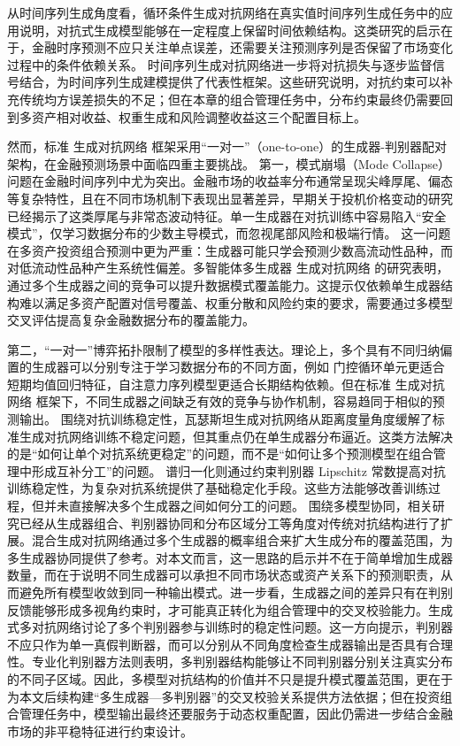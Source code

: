 从时间序列生成角度看，循环条件生成对抗网络在真实值时间序列生成任务中的应用说明，对抗式生成模型能够在一定程度上保留时间依赖结构\cite{esteban2017real}。这类研究的启示在于，金融时序预测不应只关注单点误差，还需要关注预测序列是否保留了市场变化过程中的条件依赖关系。
时间序列生成对抗网络进一步将对抗损失与逐步监督信号结合，为时间序列生成建模提供了代表性框架\cite{yoon2019time}。这些研究说明，对抗约束可以补充传统均方误差损失的不足；但在本章的组合管理任务中，分布约束最终仍需要回到多资产相对收益、权重生成和风险调整收益这三个配置目标上。

然而，标准 生成对抗网络 框架采用“一对一”（one-to-one）的生成器-判别器配对架构，在金融预测场景中面临四重主要挑战。
第一，模式崩塌（Mode Collapse）问题在金融时间序列中尤为突出。金融市场的收益率分布通常呈现尖峰厚尾、偏态等复杂特性，且在不同市场机制下表现出显著差异，早期关于投机价格变动的研究已经揭示了这类厚尾与非常态波动特征\cite{mandelbrot1963variation}。单一生成器在对抗训练中容易陷入“安全模式”，仅学习数据分布的少数主导模式，而忽视尾部风险和极端行情。
这一问题在多资产投资组合预测中更为严重：生成器可能只学会预测少数高流动性品种，而对低流动性品种产生系统性偏差。多智能体多生成器 生成对抗网络 的研究表明，通过多个生成器之间的竞争可以提升数据模式覆盖能力\cite{ghosh2017multi}。这提示仅依赖单生成器结构难以满足多资产配置对信号覆盖、权重分散和风险约束的要求，需要通过多模型交叉评估提高复杂金融数据分布的覆盖能力。

第二，“一对一”博弈拓扑限制了模型的多样性表达。理论上，多个具有不同归纳偏置的生成器可以分别专注于学习数据分布的不同方面，例如 门控循环单元更适合短期均值回归特征，自注意力序列模型更适合长期结构依赖。但在标准 生成对抗网络 框架下，不同生成器之间缺乏有效的竞争与协作机制，容易趋同于相似的预测输出。
围绕对抗训练稳定性，瓦瑟斯坦生成对抗网络从距离度量角度缓解了标准生成对抗网络训练不稳定问题，但其重点仍在单生成器分布逼近\cite{arjovsky2017wasserstein}。这类方法解决的是“如何让单个对抗系统更稳定”的问题，而不是“如何让多个预测模型在组合管理中形成互补分工”的问题。
谱归一化则通过约束判别器 Lipschitz 常数提高对抗训练稳定性，为复杂对抗系统提供了基础稳定化手段\cite{miyato2018spectral}。这些方法能够改善训练过程，但并未直接解决多个生成器之间如何分工的问题。
围绕多模型协同，相关研究已经从生成器组合、判别器协同和分布区域分工等角度对传统对抗结构进行了扩展。混合生成对抗网络通过多个生成器的概率组合来扩大生成分布的覆盖范围，为多生成器协同提供了参考\cite{hoang2018mgan}。对本文而言，这一思路的启示并不在于简单增加生成器数量，而在于说明不同生成器可以承担不同市场状态或资产关系下的预测职责，从而避免所有模型收敛到同一种输出模式。进一步看，生成器之间的差异只有在判别反馈能够形成多视角约束时，才可能真正转化为组合管理中的交叉校验能力。生成式多对抗网络讨论了多个判别器参与训练时的稳定性问题\cite{durugkar2017generative}。这一方向提示，判别器不应只作为单一真假判断器，而可以分别从不同角度检查生成器输出是否具有合理性。专业化判别器方法则表明，多判别器结构能够让不同判别器分别关注真实分布的不同子区域\cite{choi2022mclgan}。因此，多模型对抗结构的价值并不只是提升模式覆盖范围，更在于为本文后续构建“多生成器—多判别器”的交叉校验关系提供方法依据；但在投资组合管理任务中，模型输出最终还要服务于动态权重配置，因此仍需进一步结合金融市场的非平稳特征进行约束设计。

